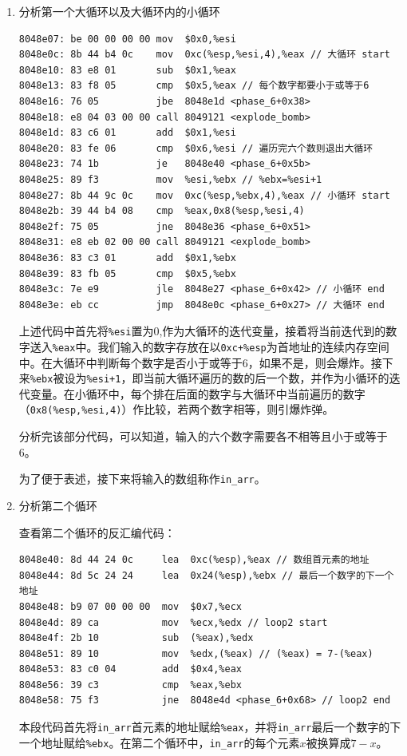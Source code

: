 \documentclass{paper}
\begin{document}
\begin{enumerate}
\begin{enumerate}
\item 分析第一个大循环以及大循环内的小循环
\begin{lstlisting}
8048e07: be 00 00 00 00 mov  $0x0,%esi
8048e0c: 8b 44 b4 0c    mov  0xc(%esp,%esi,4),%eax // 大循环 start
8048e10: 83 e8 01       sub  $0x1,%eax
8048e13: 83 f8 05       cmp  $0x5,%eax // 每个数字都要小于或等于6
8048e16: 76 05          jbe  8048e1d <phase_6+0x38>
8048e18: e8 04 03 00 00 call 8049121 <explode_bomb>
8048e1d: 83 c6 01       add  $0x1,%esi
8048e20: 83 fe 06       cmp  $0x6,%esi // 遍历完六个数则退出大循环
8048e23: 74 1b          je   8048e40 <phase_6+0x5b>
8048e25: 89 f3          mov  %esi,%ebx // %ebx=%esi+1
8048e27: 8b 44 9c 0c    mov  0xc(%esp,%ebx,4),%eax // 小循环 start
8048e2b: 39 44 b4 08    cmp  %eax,0x8(%esp,%esi,4)
8048e2f: 75 05          jne  8048e36 <phase_6+0x51>
8048e31: e8 eb 02 00 00 call 8049121 <explode_bomb>
8048e36: 83 c3 01       add  $0x1,%ebx
8048e39: 83 fb 05       cmp  $0x5,%ebx
8048e3c: 7e e9          jle  8048e27 <phase_6+0x42> // 小循环 end
8048e3e: eb cc          jmp  8048e0c <phase_6+0x27> // 大循环 end
\end{lstlisting}
上述代码中首先将\verb|%esi|置为0,作为大循环的迭代变量，接着将当前迭代到的数字送入\verb|%eax|中。我们输入的数字存放在以\verb|0xc+%esp|为首地址的连续内存空间中。在大循环中判断每个数字是否小于或等于6，如果不是，则会爆炸。接下来\verb|%ebx|被设为\verb|%esi+1|，即当前大循环遍历的数的后一个数，并作为小循环的迭代变量。在小循环中，每个排在后面的数字与大循环中当前遍历的数字（\verb|0x8(%esp,%esi,4)|）作比较，若两个数字相等，则引爆炸弹。

分析完该部分代码，可以知道，输入的六个数字需要各不相等且小于或等于6。

为了便于表述，接下来将输入的数组称作\verb|in_arr|。

\item 分析第二个循环\label{l4}

查看第二个循环的反汇编代码：
\begin{lstlisting}
8048e40: 8d 44 24 0c     lea  0xc(%esp),%eax // 数组首元素的地址
8048e44: 8d 5c 24 24     lea  0x24(%esp),%ebx // 最后一个数字的下一个地址
8048e48: b9 07 00 00 00  mov  $0x7,%ecx
8048e4d: 89 ca           mov  %ecx,%edx // loop2 start
8048e4f: 2b 10           sub  (%eax),%edx
8048e51: 89 10           mov  %edx,(%eax) // (%eax) = 7-(%eax)
8048e53: 83 c0 04        add  $0x4,%eax
8048e56: 39 c3           cmp  %eax,%ebx
8048e58: 75 f3           jne  8048e4d <phase_6+0x68> // loop2 end
\end{lstlisting}
本段代码首先将\verb|in_arr|首元素的地址赋给\verb|%eax|，并将\verb|in_arr|最后一个数字的下一个地址赋给\verb|%ebx|。在第二个循环中，\verb|in_arr|的每个元素$x$被换算成$7-x$。


\end{enumerate}
\end{enumerate}
\end{document}
